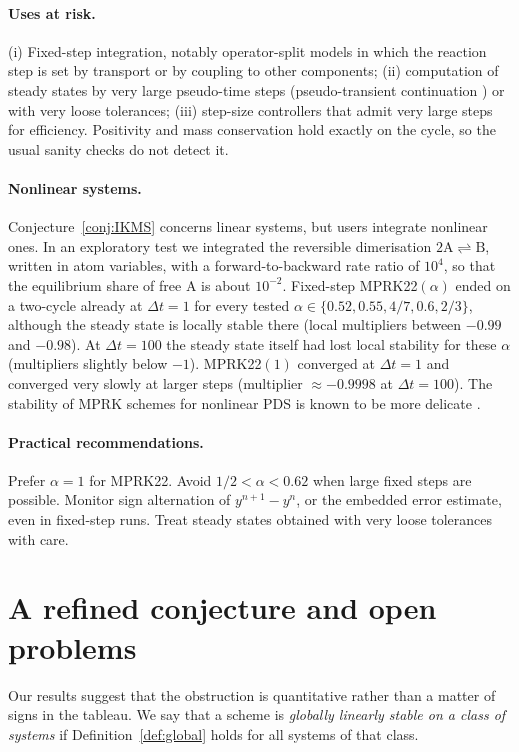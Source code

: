 \documentclass[11pt,a4paper]{article}
\theoremstyle{plain}
\theoremstyle{definition}
\begin{document}
\paragraph{Uses at risk.} (i) Fixed-step integration, notably operator-split models in which the reaction step is set by transport or by coupling to other components; (ii) computation of steady states by very large pseudo-time steps (pseudo-transient continuation \cite{KK1998}) or with very loose tolerances; (iii) step-size controllers that admit very large steps for efficiency. Positivity and mass conservation hold exactly on the cycle, so the usual sanity checks do not detect it.

\paragraph{Nonlinear systems.} Conjecture~\ref{conj:IKMS} concerns linear systems, but users integrate nonlinear ones. In an exploratory test we integrated the reversible dimerisation $2\mathrm A\rightleftharpoons\mathrm B$, written in atom variables, with a forward-to-backward rate ratio of $10^4$, so that the equilibrium share of free A is about $10^{-2}$. Fixed-step MPRK22$(\alpha)$ ended on a two-cycle already at $\Delta t=1$ for every tested $\alpha\in\{0.52,0.55,4/7,0.6,2/3\}$, although the steady state is locally stable there (local multipliers between $-0.99$ and $-0.98$). At $\Delta t=100$ the steady state itself had lost local stability for these $\alpha$ (multipliers slightly below $-1$). MPRK22$(1)$ converged at $\Delta t=1$ and converged very slowly at larger steps (multiplier $\approx-0.9998$ at $\Delta t=100$). The stability of MPRK schemes for nonlinear PDS is known to be more delicate \cite{IKM2023PAMM}.

\paragraph{Practical recommendations.} Prefer $\alpha=1$ for MPRK22. Avoid $1/2<\alpha<0.62$ when large fixed steps are possible. Monitor sign alternation of $y^{n+1}-y^n$, or the embedded error estimate, even in fixed-step runs. Treat steady states obtained with very loose tolerances with care.

\section{A refined conjecture and open problems}\label{sec:refined}

Our results suggest that the obstruction is quantitative rather than a matter of signs in the tableau. We say that a scheme is \emph{globally linearly stable on a class of systems} if Definition~\ref{def:global} holds for all systems of that class.
\end{document}
